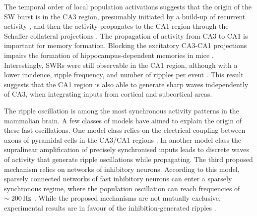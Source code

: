     The temporal order of local population activations suggests that the origin
    of the SW burst is in the CA3 region, presumably initiated by a build-up of
    recurrent activity \citep{delaPrida2006, Ellender2010, Schlingloff2014,
    Hulse2016}, and then the activity propagates to the CA1 region through the
    Schaffer collateral projections \citep{Csicsvari2000}. The propagation of
    activity from CA3 to CA1 is important for memory formation. Blocking the
    excitatory CA3-CA1 projections impairs the formation of
    hippocampus-dependent memories in mice \citep{Nakashiba2008}.
    Interestingly, SWRs were still observable in the CA1 region, although with
    a lower incidence, ripple frequency, and number of ripples per event
    \citep{Nakashiba2009}. This result suggests that the CA1 region is also
    able to generate sharp waves independently of CA3, when integrating inputs
    from cortical and subcortical areas.

    The ripple oscillation is among the most synchronous activity patterns in
    the mammalian brain. A few classes of models have aimed to explain the
    origin of these fast oscillations. One model class relies on the electrical
    coupling between axons of pyramidal cells in the CA3/CA1 regions
    \citep{Draguhn1998, Schmitz2001, Traub2012, Vladimirov2013}. In another model
    class the supralinear amplification of precisely synchronised inputs
    \citep{Memmesheimer2010, Jahnke2015} leads to discrete waves of activity
    that generate ripple oscillations while propagating. The third proposed
    mechanism relies on networks of inhibitory neurons. According to this model,
    sparsely connected networks of fast inhibitory neurons can enter a sparsely
    synchronous regime, where the population oscillation can reach frequencies
    of $\sim 200\, \rm Hz$ \citep{Brunel2003}. While the proposed mechanisms are
    not mutually exclusive, experimental results are in favour
    of the inhibition-generated ripples \citep{Buhl2005, Schlingloff2014,
    Donoso2017}.

